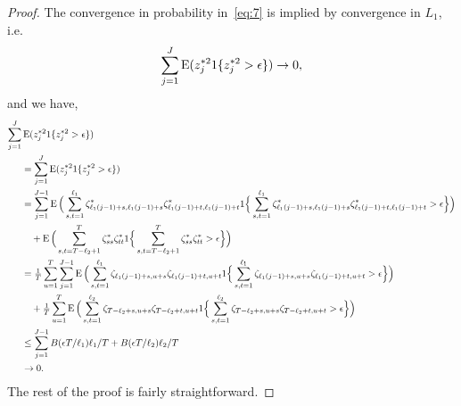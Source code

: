 \documentclass[12pt,fleqn]{article}
\begin{document}
\begin{proof}
   The convergence in probability in~\eqref{eq:7} is implied by
   convergence in $L_1$, i.e.
   \begin{equation*}
     \sum_{j=1}^J \operatorname{E}(z_j^{*2} 1\{z_j^{*2} > \epsilon\}) \to 0,
   \end{equation*}
   and we have,
   \begin{align*}
     \sum_{j=1}^J &\operatorname{E}(z_j^{*2} 1\{z_j^{*2} > \epsilon\}) \\
     &= \sum_{j=1}^J \operatorname{E}(z_j^{*2} 1\{z_j^{*2} > \epsilon\}) \\
     &= \sum_{j=1}^{J-1} \operatorname{E}\Big(\sum_{s,t =1}^{\ell_1} \zeta^*_{\ell_1 (j-1)+s,\ell_1 (j-1)+s}\zeta^*_{\ell_1 (j-1)+t,\ell_1 (j-1)+t}
     1\Big\{ \sum_{s,t = 1}^{\ell_1} \zeta^*_{\ell_1 (j-1)+s,\ell_1 (j-1)+s}\zeta^*_{\ell_1 (j-1)+t,\ell_1 (j-1)+t} > \epsilon\Big\}\Big) \\
     &\quad +
     \operatorname{E}\Big(\sum_{s,t = T-\ell_2+1}^{T} \zeta^*_{ss}\zeta^*_{tt} 1\Big\{\sum_{s,t = T - \ell_2+1}^{T} \zeta^*_{ss}\zeta^*_{tt} > \epsilon\Big\}\Big) \\
     &= \tfrac{1}{T} \sum_{u=1}^T \sum_{j=1}^{J-1} \operatorname{E}\Big(\sum_{s,t = 1}^{\ell_1} \zeta_{\ell_1(j-1) + s,u+s}\zeta_{\ell_1(j-1) + t,u+t}
     1\Big\{\sum_{s,t = 1}^{\ell_1} \zeta_{\ell_1(j-1) + s,u+s}\zeta_{\ell_1(j-1) + t,u+t} > \epsilon\Big\}\Big) \\
     &\quad +
     \tfrac{1}{T} \sum_{u=1}^T \operatorname{E}\Big(\sum_{s,t = 1}^{\ell_2} \zeta_{T-\ell_2 + s,u+s}\zeta_{T-\ell_2+t,u+t}
     1\Big\{\sum_{s,t = 1}^{\ell_2} \zeta_{T-\ell_2 + s,u+s}\zeta_{T-\ell_2+t,u+t} > \epsilon\Big\}\Big) \\
     &\leq \sum_{j=1}^{J-1} B(\epsilon T / \ell_1) \ell_1 / T
     + B(\epsilon T / \ell_2) \ell_2/T \\
     &\to 0.
   \end{align*}
   The rest of the proof is fairly straightforward.
\end{proof}


\end{document}
